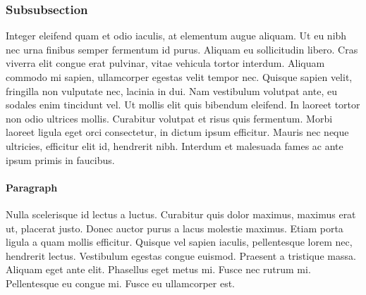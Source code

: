 \documentclass[10pt,sigconf]{acmart}
\begin{document}
\subsubsection{Subsubsection}

Integer eleifend quam et odio iaculis, at elementum augue aliquam.
Ut eu nibh nec urna finibus semper fermentum id purus.
Aliquam eu sollicitudin libero.
Cras viverra elit congue erat pulvinar, vitae vehicula tortor interdum.
Aliquam commodo mi sapien, ullamcorper egestas velit tempor nec.
Quisque sapien velit, fringilla non vulputate nec, lacinia in dui.
Nam vestibulum volutpat ante, eu sodales enim tincidunt vel.
Ut mollis elit quis bibendum eleifend.
In laoreet tortor non odio ultrices mollis.
Curabitur volutpat et risus quis fermentum.
Morbi laoreet ligula eget orci consectetur, in dictum ipsum efficitur.
Mauris nec neque ultricies, efficitur elit id, hendrerit nibh.
Interdum et malesuada fames ac ante ipsum primis in faucibus.



\paragraph{Paragraph}

Nulla scelerisque id lectus a luctus.
Curabitur quis dolor maximus, maximus erat ut, placerat justo.
Donec auctor purus a lacus molestie maximus.
Etiam porta ligula a quam mollis efficitur.
Quisque vel sapien iaculis, pellentesque lorem nec, hendrerit lectus.
Vestibulum egestas congue euismod.
Praesent a tristique massa.
Aliquam eget ante elit.
Phasellus eget metus mi.
Fusce nec rutrum mi.
Pellentesque eu congue mi.
Fusce eu ullamcorper est.


 
\end{document}
